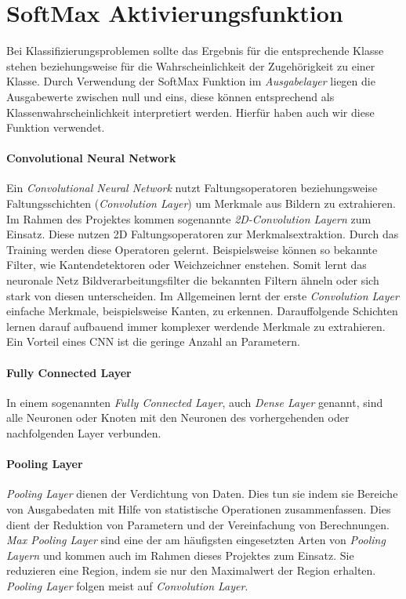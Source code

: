 \documentclass[11pt]{article}
\begin{document}
\chapter{SoftMax Aktivierungsfunktion}
Bei Klassifizierungsproblemen sollte das Ergebnis für die entsprechende Klasse stehen beziehungsweise für die Wahrscheinlichkeit der Zugehörigkeit zu einer Klasse. Durch Verwendung der SoftMax Funktion im \textit{Ausgabelayer} liegen die Ausgabewerte zwischen null und eins, diese können entsprechend als Klassenwahrscheinlichkeit interpretiert werden. Hierfür haben auch wir diese Funktion verwendet. \parencite{AndreasLindholmNiklasWahlstromFredrikLindsten2019}

\subsubsection{Convolutional Neural Network}
Ein \textit{Convolutional Neural Network} nutzt Faltungsoperatoren beziehungsweise Faltungsschichten (\textit{Convolution Layer}) um Merkmale aus Bildern zu extrahieren. Im Rahmen des Projektes kommen sogenannte \textit{2D-Convolution Layern} zum Einsatz. Diese nutzen 2D Faltungsoperatoren zur Merkmalsextraktion. Durch das Training werden diese Operatoren gelernt. Beispielsweise können so bekannte Filter, wie Kantendetektoren oder Weichzeichner enstehen. Somit lernt das neuronale Netz Bildverarbeitungsfilter die bekannten Filtern ähneln oder sich stark von diesen unterscheiden. Im Allgemeinen lernt der erste \textit{Convolution Layer} einfache Merkmale, beispielsweise Kanten, zu erkennen. Darauffolgende Schichten lernen darauf aufbauend immer komplexer werdende Merkmale zu extrahieren. Ein Vorteil eines CNN ist die geringe Anzahl an Parametern.\parencite{Pattanayak2017}

\subsubsection*{Fully Connected Layer}
In einem sogenannten \textit{Fully Connected Layer}, auch \textit{Dense Layer} genannt, sind alle Neuronen oder Knoten mit den Neuronen des vorhergehenden oder nachfolgenden Layer verbunden.\parencite{Pattanayak2017}

\subsubsection*{Pooling Layer}
\textit{Pooling Layer} dienen der Verdichtung von Daten. Dies tun sie indem sie Bereiche von Ausgabedaten mit Hilfe von statistische Operationen zusammenfassen. Dies dient der Reduktion von Parametern und der Vereinfachung von Berechnungen.  \textit{Max Pooling Layer} sind eine der am häufigsten eingesetzten Arten von \textit{Pooling Layern} und kommen auch im Rahmen dieses Projektes zum Einsatz. Sie reduzieren eine Region, indem sie nur den Maximalwert der Region erhalten. \textit{Pooling Layer} folgen meist auf \textit{Convolution Layer}.\parencite{Karpathy}\parencite{IanGoodfellowYoshuaBengio2016}
\end{document}

